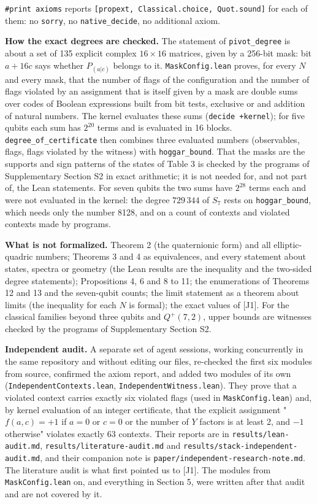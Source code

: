 \documentclass[11pt,a4paper]{article}
\begin{document}
\texttt{\#print\ axioms} reports \texttt{{[}propext,\ Classical.choice,\ Quot.sound{]}} for each of them: no \texttt{sorry}, no
\texttt{native\_decide}, no additional axiom.

\textbf{How the exact degrees are checked.} The statement of \texttt{pivot\_degree} is about a set of 135 explicit
complex \(16 \times 16\) matrices, given by a 256-bit mask: bit \(a + 16c\) says whether \(P_{(a|c)}\) belongs to
it. \texttt{MaskConfig.lean} proves, for every \(N\) and every mask, that the number of flags of the configuration
and the number of flags violated by an assignment that is itself given by a mask are double sums over
codes of Boolean expressions built from bit tests, exclusive or and addition of natural numbers. The
kernel evaluates these sums (\texttt{decide\ +kernel}); for five qubits each sum has \(2^{20}\) terms and is
evaluated in 16 blocks. \texttt{degree\_of\_certificate} then combines three evaluated numbers (observables,
flags, flags violated by the witness) with \texttt{hoggar\_bound}. That the masks are the supports and sign
patterns of the states of Table 3 is checked by the programs of Supplementary Section S2 in exact arithmetic; it is
not needed for, and not part of, the Lean statements. For seven qubits the two sums have \(2^{28}\) terms
each and were not evaluated in the kernel: the degree \(729\,344\) of \(S_7\) rests on \texttt{hoggar\_bound}, which
needs only the number 8128, and on a count of contexts and violated contexts made by programs.

\textbf{What is not formalized.} Theorem 2 (the quaternionic form) and all elliptic-quadric numbers;
Theorems 3 and 4 as equivalences, and every statement about states, spectra or geometry (the Lean
results are the inequality and the two-sided degree statements); Propositions 4, 6 and 8 to 11; the
enumerations of Theorems 12 and 13 and the seven-qubit counts; the limit
statement as a theorem about limits (the inequality for each \(N\) is formal); the exact values of {[}J1{]}.
For the classical families beyond three qubits and \(Q^+(7,2)\), upper bounds are witnesses checked by
the programs of Supplementary Section S2.

\textbf{Independent audit.} A separate set of agent sessions, working concurrently in the same repository
and without editing our files, re-checked the first six modules from source, confirmed the axiom
report, and added two modules of its own (\texttt{IndependentContexts.lean}, \texttt{IndependentWitness.lean}). They
prove that a violated context carries exactly six violated flags (used in \texttt{MaskConfig.lean}) and, by
kernel evaluation of an integer certificate, that the explicit assignment
"\(f(a,c) = +1\) if \(a = 0\) or \(c = 0\) or the number of \(Y\) factors is at least 2, and \(-1\) otherwise"
violates exactly 63 contexts. Their reports are in \texttt{results/lean-audit.md},
\texttt{results/literature-audit.md} and \texttt{results/stack-independent-audit.md}, and their companion note is
\texttt{paper/independent-research-note.md}. The literature audit is what first pointed us to {[}J1{]}. The
modules from \texttt{MaskConfig.lean} on, and everything in Section 5, were written after that audit and are
not covered by it.
\end{document}
